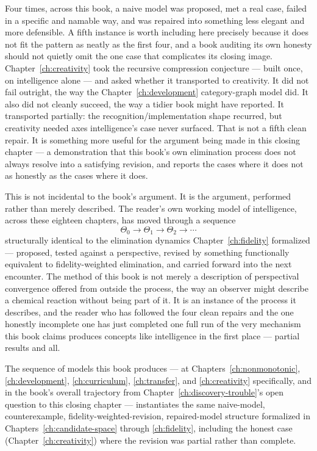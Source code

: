 Four times, across this book, a naive model was proposed, met a real case, failed in a specific and namable way, and was repaired into something less elegant and more defensible. A fifth instance is worth including here precisely because it does not fit the pattern as neatly as the first four, and a book auditing its own honesty should not quietly omit the one case that complicates its closing image. Chapter~\ref{ch:creativity} took the recursive compression conjecture --- built once, on intelligence alone --- and asked whether it transported to creativity. It did not fail outright, the way the Chapter~\ref{ch:development} category-graph model did. It also did not cleanly succeed, the way a tidier book might have reported. It transported partially: the recognition/implementation shape recurred, but creativity needed axes intelligence's case never surfaced. That is not a fifth clean repair. It is something more useful for the argument being made in this closing chapter --- a demonstration that this book's own elimination process does not always resolve into a satisfying revision, and reports the cases where it does not as honestly as the cases where it does.

This is not incidental to the book's argument. It is the argument, performed rather than merely described. The reader's own working model of intelligence, across these eighteen chapters, has moved through a sequence
\[
\Theta_0 \rightarrow \Theta_1 \rightarrow \Theta_2 \rightarrow \cdots
\]
structurally identical to the elimination dynamics Chapter~\ref{ch:fidelity} formalized --- proposed, tested against a perspective, revised by something functionally equivalent to fidelity-weighted elimination, and carried forward into the next encounter. The method of this book is not merely a description of perspectival convergence offered from outside the process, the way an observer might describe a chemical reaction without being part of it. It is an instance of the process it describes, and the reader who has followed the four clean repairs and the one honestly incomplete one has just completed one full run of the very mechanism this book claims produces concepts like intelligence in the first place --- partial results and all.

\begin{proposition}
The sequence of models this book produces --- at Chapters~\ref{ch:nonmonotonic}, \ref{ch:development}, \ref{ch:curriculum}, \ref{ch:transfer}, and \ref{ch:creativity} specifically, and in the book's overall trajectory from Chapter~\ref{ch:discovery-trouble}'s open question to this closing chapter --- instantiates the same naive-model, counterexample, fidelity-weighted-revision, repaired-model structure formalized in Chapters~\ref{ch:candidate-space} through \ref{ch:fidelity}, including the honest case (Chapter~\ref{ch:creativity}) where the revision was partial rather than complete.
\end{proposition}

